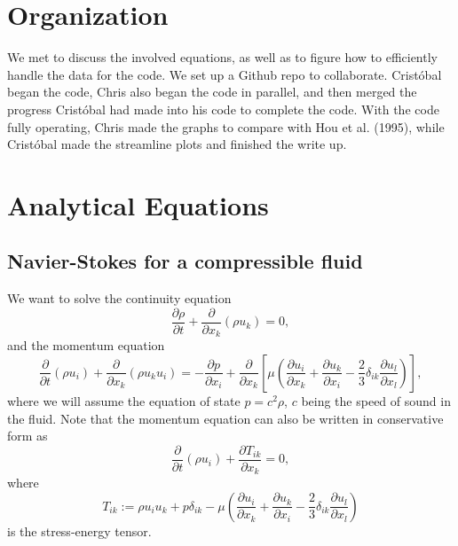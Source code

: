 \documentclass[11pt]{article}
\begin{document}
\maketitle

\section*{Organization}

We met to discuss the involved equations, as well as to figure how to efficiently handle the data for the code. We set up a Github repo to collaborate. Crist\'obal began the code, Chris also began the code in parallel, and then merged the progress Crist\'obal had made into his code to complete the code. With the code fully operating, Chris made the graphs to compare with Hou et al. (1995), while Crist\'obal made the streamline plots and finished the write up.

\section{Analytical Equations}

\subsection{Navier-Stokes for a compressible fluid}

We want to solve the continuity equation
\begin{equation}
\frac{\partial \rho}{\partial t} + \frac{\partial}{\partial x_k}\left(\rho u_k\right) = 0,
\end{equation}
and the momentum equation
\begin{equation}
\frac{\partial}{\partial t}\left(\rho u_i\right) + \frac{\partial}{\partial x_k}\left(\rho u_k u_i\right) = -\frac{\partial p}{\partial x_i} + \frac{\partial}{\partial x_k}\left[\mu\left(\frac{\partial u_i}{\partial x_k} + \frac{\partial u_k}{\partial x_i}- \frac{2}{3}\delta_{ik}\frac{\partial u_l}{\partial x_l}\right)\right],
\end{equation}
where we will assume the equation of state $p = c^2\rho$, $c$ being the speed of sound in the fluid. Note that the momentum equation can also be written in conservative form as
\begin{equation}
\frac{\partial}{\partial t}\left(\rho u_i\right) + \frac{\partial T_{ik}}{\partial x_k} = 0,
\end{equation}
where
\begin{equation}
T_{ik} := \rho u_i u_k + p\delta_{ik} - \mu\left(\frac{\partial u_i}{\partial x_k} + \frac{\partial u_k}{\partial x_i}- \frac{2}{3}\delta_{ik}\frac{\partial u_l}{\partial x_l}\right)
\end{equation}
is the stress-energy tensor.
\end{document}
